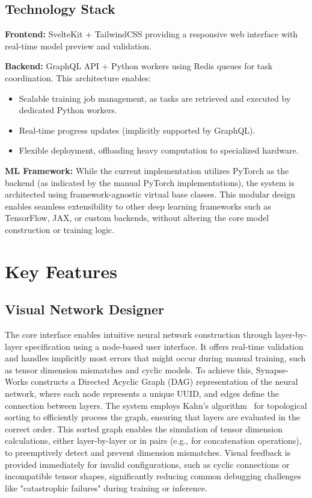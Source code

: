 \documentclass[10pt,conference]{IEEEtran}
\newcommand{\synapse}{Synapse-Works }
\begin{document}
\subsection{Technology Stack}
\textbf{Frontend:} SvelteKit + TailwindCSS providing a responsive web interface with real-time model preview and validation.

\textbf{Backend:} GraphQL API + Python workers using Redis queues for task coordination. This architecture enables:
\begin{itemize}
    \item Scalable training job management, as tasks are retrieved and executed by
          dedicated Python workers.
    \item Real-time progress updates (implicitly supported by GraphQL).
    \item Flexible deployment, offloading heavy computation to specialized hardware.
\end{itemize}

\textbf{ML Framework:} While the current implementation utilizes PyTorch as the backend (as indicated by the manual PyTorch implementations), the system is architected using framework-agnostic virtual base classes. This modular design enables seamless extensibility to other deep learning frameworks such as TensorFlow, JAX, or custom backends, without altering the core model construction or training logic.

\section{Key Features}
\subsection{Visual Network Designer}
The core interface enables intuitive neural network construction through
layer-by-layer specification using a node-based user interface. It offers
real-time validation and handles implicitly most errors that might occur during
manual training, such as tensor dimension mismatches and cyclic models. To
achieve this, \synapse constructs a Directed Acyclic Graph (DAG) representation
of the neural network, where each node represents a unique UUID, and edges
define the connection between layers. The system employs Kahn's
algorithm~\cite{kahn1962topological} for topological sorting to efficiently
process the graph, ensuring that layers are evaluated in the correct order.
This sorted graph enables the simulation of tensor dimension calculations,
either layer-by-layer or in pairs (e.g., for concatenation operations), to
preemptively detect and prevent dimension mismatches. Visual feedback is
provided immediately for invalid configurations, such as cyclic connections or
incompatible tensor shapes, significantly reducing common debugging challenges
like "catastrophic failures" during training or inference.
\end{document}
